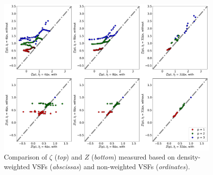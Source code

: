 \begin{figure}
	\centering
    \includegraphics[width=\textwidth]{comp_weighting.pdf}
    \caption{ Comparison of $\zeta$ (\textit{top}) and $Z$ (\textit{bottom}) measured based on density-weighted VSFs (\textit{abscissas}) and non-weighted VSFs (\textit{ordinates}). }
    \label{pic:results:comp_weighting}
\end{figure}
